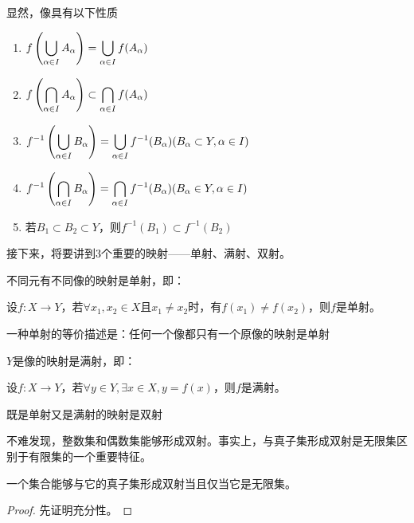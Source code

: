 显然，像具有以下性质

\begin{enumerate}
    \item $\displaystyle f\left(\bigcup_{\alpha \in I}A_\alpha \right)= \bigcup_{\alpha \in I}f(A_\alpha)$
    \item $\displaystyle f\left(\bigcap_{\alpha \in I}A_\alpha \right)\subset \bigcap_{\alpha \in I}f(A_\alpha)$
    \item $\displaystyle f^{-1}\left(\bigcup_{\alpha \in I}B_\alpha \right)= \bigcup_{\alpha \in I}f^{-1}(B_\alpha)(B_\alpha \subset Y,\alpha \in I)$
    \item $\displaystyle f^{-1}\left(\bigcap_{\alpha \in I}B_\alpha \right)= \bigcap_{\alpha \in I}f^{-1}(B_\alpha)(B_\alpha\in Y,\alpha \in I)$ 
    \item 若$B_1\subset B_2 \subset Y$，则$f^{-1}(B_1)\subset f^{-1}(B_2)$
\end{enumerate}

接下来，将要讲到3个重要的映射——单射、满射、双射。

\begin{definition}[单射]
    不同元有不同像的映射是单射，即：

    设$f:X\rightarrow Y$，若$\forall x_1,x_2 \in X\text{且}x_1 \neq x_2$时，有$f(x_1)\neq f(x_2)$，则$f$是单射。
\end{definition}

    一种单射的等价描述是：任何一个像都只有一个原像的映射是单射

\begin{definition}[满射]
    $Y$是像的映射是满射，即：

    设$f:X\rightarrow Y$，若$\forall y\in Y,\exists x\in X,y=f(x)$，则$f$是满射。
\end{definition}

\begin{definition}[双射]
    既是单射又是满射的映射是双射
\end{definition}

不难发现，整数集和偶数集能够形成双射。事实上，与真子集形成双射是无限集区别于有限集的一个重要特征。

\begin{proposition}
    一个集合能够与它的真子集形成双射当且仅当它是无限集。
\end{proposition}

\begin{proof}
    先证明充分性。
\end{proof}